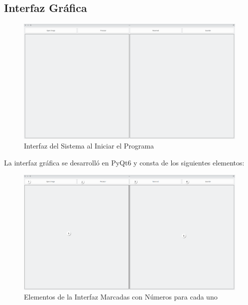 \documentclass[conference]{IEEEtran}
\begin{document}
    \subsection{Interfaz Gráfica}
    \begin{figure}[H]
        \centering
        \includegraphics[width=\breite\linewidth]{images/UI.png}
        \caption{Interfaz del Sistema al Iniciar el Programa}
        \label{fig:res1}
    \end{figure}

    La interfaz gráfica se desarrolló en PyQt6\cite{pyqt6} y consta de los siguientes elementos:
    
    \begin{figure}[H]
        \centering
        \includegraphics[width=\breite\linewidth]{images/secciones.png}
        \caption{Elementos de la Interfaz Marcadas con Números para cada uno}
        \label{fig:secciones}
    \end{figure}
    
\end{document}
